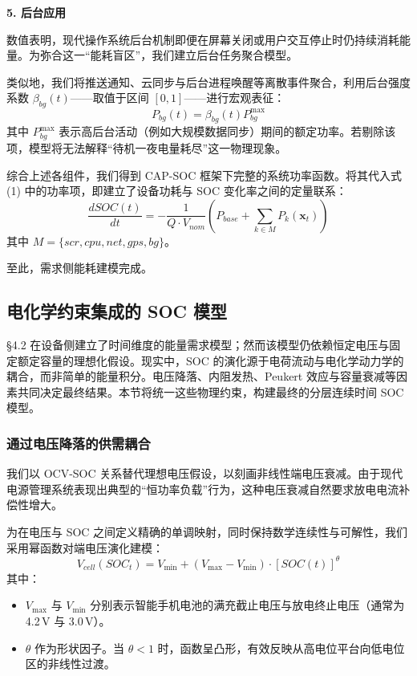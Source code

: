\documentclass[11pt,a4paper]{ctexart}
\begin{document}
\noindent\textbf{5. 后台应用}

数值表明，现代操作系统后台机制即便在屏幕关闭或用户交互停止时仍持续消耗能量。为弥合这一“能耗盲区”，我们建立后台任务聚合模型。

类似地，我们将推送通知、云同步与后台进程唤醒等离散事件聚合，利用后台强度系数 $\beta_{bg}(t)$——取值于区间 $[0,1]$——进行宏观表征：
\begin{equation}
P_{bg}(t) = \beta_{bg}(t)P_{bg}^{\max}
\end{equation}
其中 $P_{bg}^{\max}$ 表示高后台活动（例如大规模数据同步）期间的额定功率。若剔除该项，模型将无法解释“待机一夜电量耗尽”这一物理现象。

综合上述各组件，我们得到 CAP-SOC 框架下完整的系统功率函数。将其代入式 (1) 中的功率项，即建立了设备功耗与 SOC 变化率之间的定量联系：
\begin{equation}
\frac{dSOC(t)}{dt} = -\frac{1}{Q\cdot V_{nom}}\left(P_{base} + \sum_{k\in M} P_k(\mathbf{x}_t)\right)
\end{equation}
其中 $M=\{scr,cpu,net,gps,bg\}$。

至此，需求侧能耗建模完成。

\subsection{电化学约束集成的 SOC 模型}

§4.2 在设备侧建立了时间维度的能量需求模型；然而该模型仍依赖恒定电压与固定额定容量的理想化假设。现实中，SOC 的演化源于电荷流动与电化学动力学的耦合，而非简单的能量积分。电压降落、内阻发热、Peukert 效应与容量衰减等因素共同决定最终结果。本节将统一这些物理约束，构建最终的分层连续时间 SOC 模型。

\subsubsection{通过电压降落的供需耦合}

我们以 OCV-SOC 关系替代理想电压假设，以刻画非线性端电压衰减。由于现代电源管理系统表现出典型的“恒功率负载”行为，这种电压衰减自然要求放电电流补偿性增大。

为在电压与 SOC 之间定义精确的单调映射，同时保持数学连续性与可解性，我们采用幂函数对端电压演化建模：
\begin{equation}
V_{cell}(SOC_t) = V_{\min} + \left(V_{\max} - V_{\min}\right)\cdot [SOC(t)]^{\theta}
\end{equation}
其中：

\begin{itemize}[leftmargin=2em]
\item $V_{\max}$ 与 $V_{\min}$ 分别表示智能手机电池的满充截止电压与放电终止电压（通常为 4.2\,V 与 3.0\,V）\cite{bu303}。
\item $\theta$ 作为形状因子。当 $\theta<1$ 时，函数呈凸形，有效反映从高电位平台向低电位区的非线性过渡\cite{plett2004}。
\end{itemize}
\end{document}
